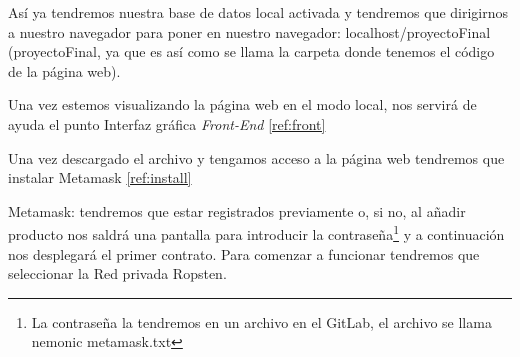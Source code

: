 Así ya tendremos nuestra base de datos local activada y tendremos que dirigirnos a nuestro navegador para poner en nuestro navegador: localhost/proyectoFinal (proyectoFinal, ya que es así como se llama la carpeta donde tenemos el código de la página web).

Una vez estemos visualizando la página web en el modo local, nos servirá de ayuda el punto Interfaz gráfica \textit{Front-End} \ref{ref:front}

Una vez descargado el archivo y tengamos acceso a la página web tendremos que instalar Metamask \ref{ref:install}

Metamask: tendremos que estar registrados previamente o, si no, al añadir producto nos saldrá una pantalla para introducir la contraseña\footnote{La contraseña la tendremos en un archivo en el GitLab, el archivo se llama nemonic metamask.txt} y a continuación nos desplegará el primer contrato. Para comenzar a funcionar tendremos que  seleccionar la Red privada Ropsten.
